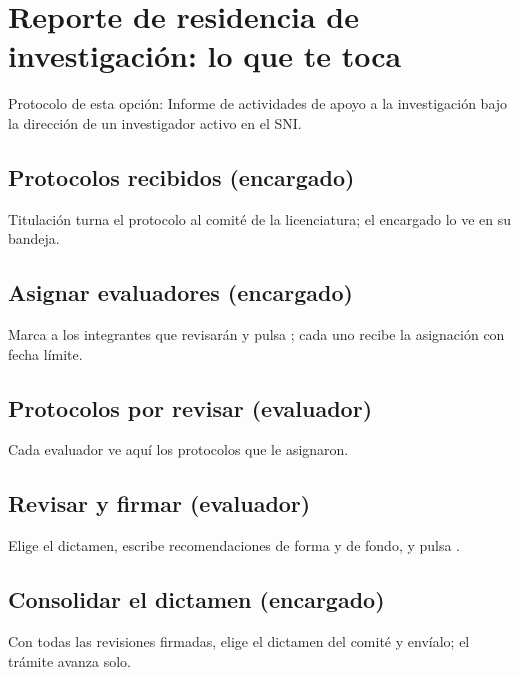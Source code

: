 \section{Reporte de residencia de investigación: lo que te toca}
Protocolo de esta opción: Informe de actividades de apoyo a la investigación bajo la dirección de un investigador activo en el SNI.
\subsection{Protocolos recibidos (encargado)}
Titulación turna el protocolo al comité de la licenciatura; el encargado lo ve en su bandeja.
\subsection{Asignar evaluadores (encargado)}
Marca a los integrantes que revisarán y pulsa ; cada uno recibe la asignación con fecha límite.
\subsection{Protocolos por revisar (evaluador)}
Cada evaluador ve aquí los protocolos que le asignaron.
\subsection{Revisar y firmar (evaluador)}
Elige el dictamen, escribe recomendaciones de forma y de fondo, y pulsa .
\subsection{Consolidar el dictamen (encargado)}
Con todas las revisiones firmadas, elige el dictamen del comité y envíalo; el trámite avanza solo.
